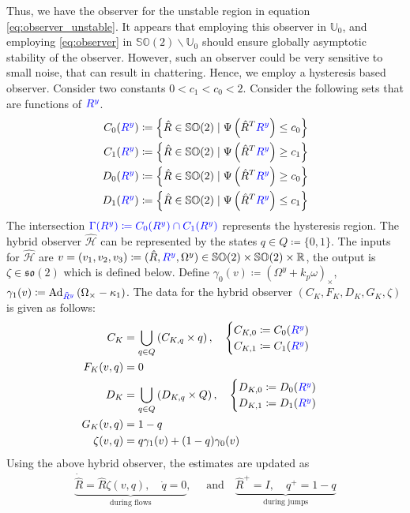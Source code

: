 \documentclass{article}
\newcommand{\SOtwo}{\mathbb{SO}(2)}
\newcommand{\sotwo}{\mathfrak{so}(2)}
\newcommand{\R}[1]{\mathbb{R}^{#1}}
\newcommand{\brackets}[1]{\left(#1\right)}
\newcommand{\adjoint}[2]{\text{Ad}_{#1}#2}
\newcommand{\textblue}[1]{\textcolor{blue}{#1}}
\begin{document}
Thus, we have the observer for the unstable region in equation \eqref{eq:observer_unstable}. It appears that employing this observer in $\mathbb{U}_0$, and employing \eqref{eq:observer} in $\SOtwo\backslash \mathbb{U}_0$ should ensure globally asymptotic stability of the observer. However, such an observer could be very sensitive to small noise, that can result in chattering. Hence, we employ a hysteresis based observer. Consider two constants $ 0 < c_1 < c_0 < 2$. Consider the following sets that are functions of $\textblue{R^y}$.
\begin{align}
    C_0(\textblue{R^y}) &\coloneqq \left\{\hat{R} \in \SOtwo\mid \Psi\left(\hat{R}^T\textblue{R^y}\right) \leq c_{0} \right\}\\
    C_1(\textblue{R^y}) &\coloneqq \left\{\hat{R} \in \SOtwo\mid \Psi\brackets{\hat{R}^T\textblue{R^y}} \geq c_1 \right\}\\
    D_0(\textblue{R^y}) &\coloneqq \left\{\hat{R} \in \SOtwo\mid \Psi\left(\hat{R}^T\textblue{R^y}\right) \geq c_{0} \right\}\\
    D_1(\textblue{R^y}) &\coloneqq \left\{\hat{R} \in \SOtwo\mid \Psi\brackets{\hat{R}^T\textblue{R^y}} \leq c_1 \right\}
\end{align}
The intersection $\textblue{\Gamma({R}^y) \coloneqq C_0({R}^y)\cap C_{1}({R}^y)}$ represents the hysteresis region. The hybrid observer $\hat{\mathcal{H}}$ can be represented by the states $q \in Q\coloneqq \{0, 1\}$. The inputs for $\hat{\mathcal{H}}$ are $v = (v_1, v_2, v_3) \coloneqq (\hat{R}, \textblue{R^y}, \Omega^y) \in \SOtwo\times\SOtwo\times\R{}$, the output is $\zeta \in \sotwo$ which is defined below. Define $\gamma_0(v) \coloneqq (\Omega^y + k_p\omega)_\times$, $\gamma_1(v) \coloneqq \adjoint{\textblue{\Tilde{R}^y}}{\brackets{\Omega_\times - \kappa_1}}$. The data for the hybrid observer $\brackets{C_K, F_K, D_K, G_K, \zeta}$ is given as follows:
\begin{align}
    C_K &= \bigcup_{q\in Q}\brackets{C_{K, q}\times q}, \quad \begin{cases}
        C_{K, 0} \coloneqq C_0(\textblue{R^y})\\
        C_{K, 1} \coloneqq C_1(\textblue{R^y})
    \end{cases}\\
    F_K(v, q) &= 0\\
    D_K &= \bigcup_{q\in Q} \brackets{D_{K, q}\times Q}, \quad \begin{cases}
        D_{K,0} \coloneqq D_0(\textblue{R^y})\\
        D_{K,1} \coloneqq D_1(\textblue{R^y})
    \end{cases}\\
    G_K(v, q) &= 1 - q\\
    \zeta(v, q) &= q\gamma_1(v) + (1-q)\gamma_0(v)
\end{align}
Using the above hybrid observer, the estimates are updated as 
\begin{align} \label{eq:observer_final}
\underbrace{\dot{\hat{R}} = \hat{R}\zeta(v, q), \quad \dot{q} = 0}_{\text{during flows}}, \quad \text{ and}\quad  \underbrace{\hat{R}^+ = I, \quad q^+ = 1 - q}_\text{during jumps}
\end{align}
\end{document}
